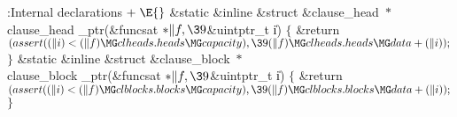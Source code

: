 \Y\B\4:Internal declarations\X${}\mathrel+\E{}$\6
\&{static} \&{inline} \&{struct} \&{clause\_head} ${}{*}{}$\\{clause\_head%
\_ptr}(\&{funcsat} ${}{*}\|f,\39{}$\&{uintptr\_t} \|i)\1\1\2\2\6
${}\{{}$\1\6
\&{return} ${}(\\{assert}((\|i)<(\|f)\MG\\{clheads}.\\{heads}\MG\\{capacity}),%
\39(\|f)\MG\\{clheads}.\\{heads}\MG\\{data}+(\|i));{}$\6
\4${}\}{}$\2\7
\&{static} \&{inline} \&{struct} \&{clause\_block} ${}{*}{}$\\{clause\_block%
\_ptr}(\&{funcsat} ${}{*}\|f,\39{}$\&{uintptr\_t} \|i)\1\1\2\2\6
${}\{{}$\1\6
\&{return} ${}(\\{assert}((\|i)<(\|f)\MG\\{clblocks}.\\{blocks}\MG%
\\{capacity}),\39(\|f)\MG\\{clblocks}.\\{blocks}\MG\\{data}+(\|i));{}$\6
\4${}\}{}$\2\par
\fi

